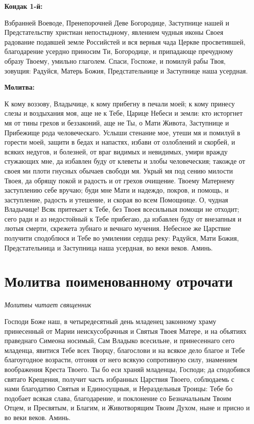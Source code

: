 \medskip
\bfseries Кондак 1-й:\normalfont{}


Взбранней Воеводе, Пренепорочней Деве Богородице, Заступнице нашей и Предстательству христиан непостыдному, явлением чудныя иконы Своея радование подавшей земле Российстей и вся верныя чада Церкве просветившей, благодарение усердно приносим Ти, Богородице, и припадающе пречудному образу Твоему, умильно глаголем. Спаси, Госпоже, и помилуй рабы Твоя, зовущия: Радуйся, Матерь Божия, Предстательнице и Заступнице наша усердная.


\medskip
\bfseries Молитва:\normalfont{}


К кому воззову, Владычице, к кому прибегну в печали моей; к кому принесу слезы и воздыхания моя, аще не к Тебе, Царице Небеси и земли: кто исторгнет мя от тины грехов и беззаконий, аще не Ты, о Мати Живота, Заступнице и Прибежище рода человеческаго. Услыши стенание мое, утеши мя и помилуй в горести моей, защити в бедах и напастях, избави от озлоблений и скорбей, и всяких недугов, и болезней, от враг видимых и невидимых, умири вражду стужающих мне, да избавлен буду от клеветы и злобы человеческия; такожде от своея ми плоти гнусных обычаев свободи мя. Укрый мя под сению милости Твоея, да обрящу покой и радость и от грехов очищение. Твоему Матернему заступлению себе вручаю; буди мне Мати и надеждо, покров, и помощь, и заступление, радость и утешение, и скорая во всем Помощнице. О, чудная Владычице! Всяк притекает к Тебе, без Твоея всесильныя помощи не отходит; сего ради и аз недостойный к Тебе прибегаю, да избавлен буду от внезапныя и лютыя смерти, скрежета зубнаго и вечнаго мучения. Небесное же Царствие получити сподоблюся и Тебе во умилении сердца реку: Радуйся, Мати Божия, Предстательница и Заступница наша усердная, во веки веков. Аминь.


 

\section{Молитва поименованному отрочати}
 


\itshape Молитвы читает священник\normalfont{}

Господи Боже наш, в четыредесятный день младенец законному храму принесенный от Марии неискусобрачныя и Святыя Твоея Матере, и на объятиях праведнаго Симеона носимый, Сам Владыко всесильне, и принесеннаго сего младенца, явитися Тебе всех Творцу, благослови и на всякое дело благое и Тебе благоугодное возрасти, отгоняя от него всякую сопротивную силу, знамением воображения Креста Твоего. Ты бо еси храняй младенцы, Господи; да сподобився святаго Крещения, получит часть избранных Царствия Твоего, соблюдаемь с нами благодатию Святыя и Единосущныя, и Нераздельныя Троицы: Тебе бо подобает всякая слава, благодарение, и поклонение со Безначальным Твоим Отцем, и Пресвятым, и Благим, и Животворящим Твоим Духом, ныне и присно и во веки веков. Аминь. 


